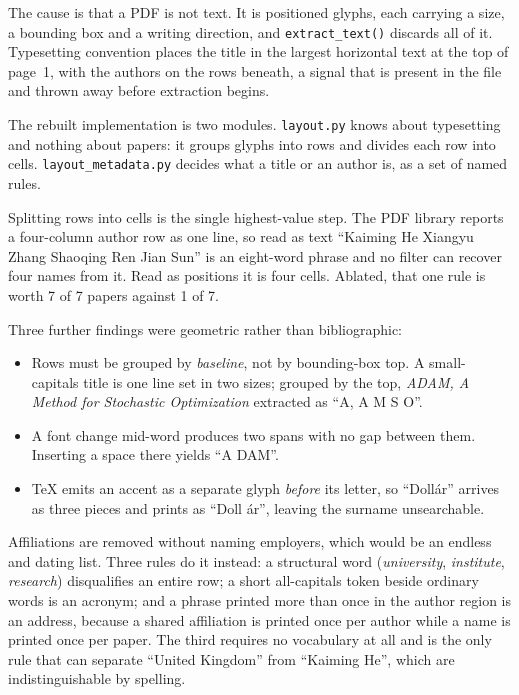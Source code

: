 \documentclass[12pt,a4paper]{report}
\begin{document}
The cause is that a PDF is not text. It is positioned glyphs, each carrying a
size, a bounding box and a writing direction, and \texttt{extract\_text()}
discards all of it. Typesetting convention places the title in the largest
horizontal text at the top of page~1, with the authors on the rows beneath,
a signal that is present in the file and thrown away before extraction begins.

The rebuilt implementation is two modules. \texttt{layout.py} knows about
typesetting and nothing about papers: it groups glyphs into rows and divides
each row into cells. \texttt{layout\_metadata.py} decides what a title or an
author is, as a set of named rules.

Splitting rows into cells is the single highest-value step. The PDF library
reports a four-column author row as one line, so read as text
``Kaiming He Xiangyu Zhang Shaoqing Ren Jian Sun'' is an eight-word phrase and
no filter can recover four names from it. Read as positions it is four cells.
Ablated, that one rule is worth 7 of 7 papers against 1 of 7.

Three further findings were geometric rather than bibliographic:

\begin{itemize}[leftmargin=*]
  \item Rows must be grouped by \emph{baseline}, not by bounding-box top. A
        small-capitals title is one line set in two sizes; grouped by the top,
        \emph{ADAM, A Method for Stochastic Optimization} extracted as
        ``A, A M S O''.
  \item A font change mid-word produces two spans with no gap between them.
        Inserting a space there yields ``A DAM''.
  \item \TeX{} emits an accent as a separate glyph \emph{before} its letter, so
        ``Doll\'ar'' arrives as three pieces and prints as ``Doll \'ar'',
        leaving the surname unsearchable.
\end{itemize}

Affiliations are removed without naming employers, which would be an endless and
dating list. Three rules do it instead: a structural word (\emph{university},
\emph{institute}, \emph{research}) disqualifies an entire row; a short
all-capitals token beside ordinary words is an acronym; and a phrase printed
more than once in the author region is an address, because a shared affiliation
is printed once per author while a name is printed once per paper. The third
requires no vocabulary at all and is the only rule that can separate ``United
Kingdom'' from ``Kaiming He'', which are indistinguishable by spelling.
\end{document}
